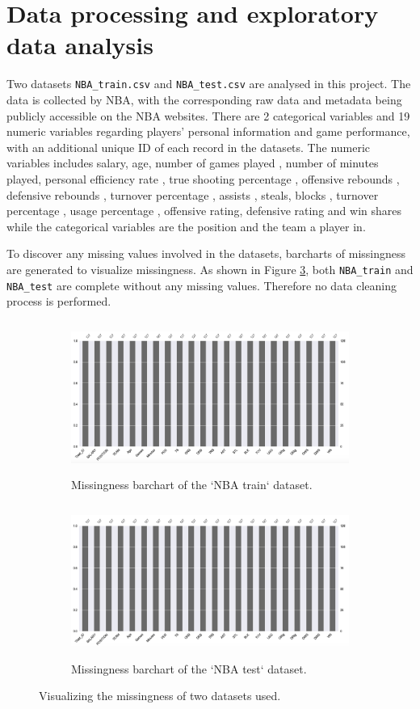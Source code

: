 \documentclass[letterpaper,12pt,twoside,]{pinp}
\begin{document}
\hypertarget{data-processing-and-exploratory-data-analysis}{%
\section{Data processing and exploratory data
analysis}\label{data-processing-and-exploratory-data-analysis}}

Two datasets \texttt{NBA\_train.csv} and \texttt{NBA\_test.csv} are
analysed in this project. The data is collected by NBA, with the
corresponding raw data and metadata being publicly accessible on the NBA
websites. There are 2 categorical variables and 19 numeric variables
regarding players' personal information and game performance, with an
additional unique ID of each record in the datasets. The numeric
variables includes salary, age, number of games played , number of
minutes played, personal efficiency rate , true shooting percentage ,
offensive rebounds , defensive rebounds , turnover percentage , assists
, steals, blocks , turnover percentage , usage percentage , offensive
rating, defensive rating and win shares while the categorical variables
are the position and the team a player in.

To discover any missing values involved in the datasets, barcharts of
missingness are generated to visualize missingness. As shown in Figure
\ref{fig:missingness}, both \texttt{NBA\_train} and \texttt{NBA\_test}
are complete without any missing values. Therefore no data cleaning
process is performed.

\begin{figure}[H]
\begin{subfigure}{0.55\textwidth}
\includegraphics[width=0.9\linewidth, height=5cm]{nbaTrain_miss.png} 
\caption{Missingness barchart of the `NBA train` dataset.}
\label{fig:trainMiss}
\end{subfigure}
\begin{subfigure}{0.55\textwidth}
\includegraphics[width=0.9\linewidth, height=5cm]{nbaTest_miss.png}
\caption{Missingness barchart of the `NBA test` dataset.}
\label{fig:testMiss}
\end{subfigure}
\caption{Visualizing the missingness of two datasets used.}
\label{fig:missingness}
\end{figure}
\end{document}
